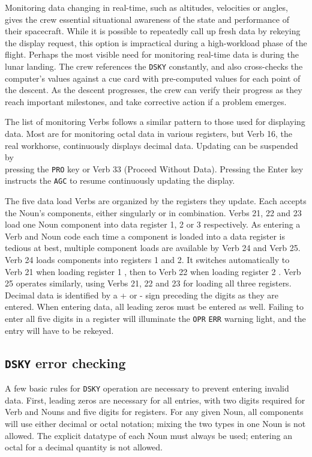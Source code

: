 \documentclass[refcap, oxford]{ahsan}
\begin{document}
Monitoring data changing in real-time, such as altitudes, velocities or angles, gives the crew essential situational awareness of the state and performance of their spacecraft. While it is possible to repeatedly call up fresh data by rekeying the display request, this option is impractical during a high-workload phase of the flight. Perhaps the most visible need for monitoring real-time data is during the lunar landing. The crew references the \texttt{DSKY} constantly, and also cross-checks the computer's values against a cue card with pre-computed values for each point of the descent. As the descent progresses, the crew can verify their progress as they reach important milestones, and take corrective action if a problem emerges.

The list of monitoring Verbs follows a similar pattern to those used for displaying data. Most are for monitoring octal data in various registers, but Verb 16, the real workhorse, continuously displays decimal data. Updating can be suspended by\\
pressing the \texttt{PRO} key or Verb 33 (Proceed Without Data). Pressing the Enter key instructs the \texttt{AGC} to resume continuously updating the display.

The five data load Verbs are organized by the registers they update. Each accepts the Noun's components, either singularly or in combination. Verbs 21, 22 and 23 load one Noun component into data register 1, 2 or 3 respectively. As entering a Verb and Noun code each time a component is loaded into a data register is tedious at best, multiple component loads are available by Verb 24 and Verb 25. Verb 24 loads components into registers 1 and 2. It switches automatically to Verb 21 when loading register 1 , then to Verb 22 when loading register 2 . Verb 25 operates similarly, using Verbs 21, 22 and 23 for loading all three registers. Decimal data is identified by a + or - sign preceding the digits as they are entered. When entering data, all leading zeros must be entered as well. Failing to enter all five digits in a register will illuminate the \texttt{OPR} \texttt{ERR} warning light, and the entry will have to be rekeyed.


\subsection{\texttt{DSKY} error checking}
A few basic rules for \texttt{DSKY} operation are necessary to prevent entering invalid data. First, leading zeros are necessary for all entries, with two digits required for Verb and Nouns and five digits for registers. For any given Noun, all components will use either decimal or octal notation; mixing the two types in one Noun is not allowed. The explicit datatype of each Noun must always be used; entering an octal for a decimal quantity is not allowed.
\end{document}
